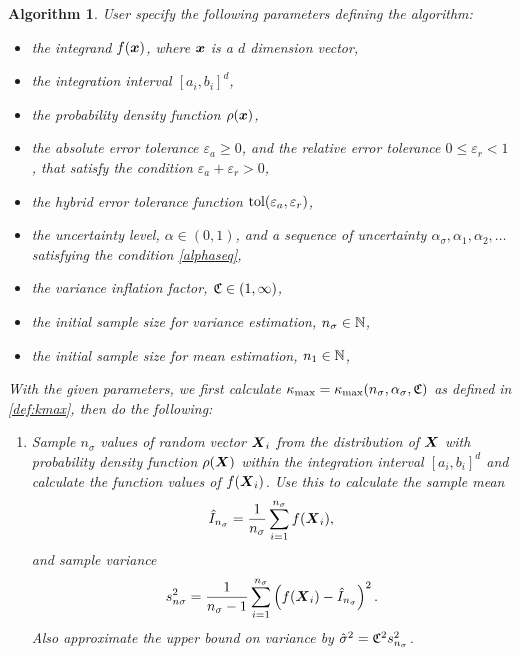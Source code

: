 \documentclass{iitthesis}
\newtheorem{algorithm}[theorem]{Algorithm}
\begin{document}
\begin{algorithm}\label{alg:cubMCg} 
User specify the following parameters defining the algorithm:
\begin{itemize}
\item the integrand $f(\boldsymbol{x})$, where $\boldsymbol{x}$ is a $d$ dimension vector, 
\item the integration interval $[a_i,b_i]^d$,
\item the probability density function $\rho(\boldsymbol{x})$,
\item the absolute error tolerance $\varepsilon_a \geq 0$, and the relative error tolerance $0 \leq \varepsilon_r <1$, that satisfy the condition $\varepsilon_a+\varepsilon_r >0$,
\item the hybrid error tolerance function $\operatorname{tol}(\varepsilon_a,\varepsilon_r)$,
\item the uncertainty level, $\alpha\in (0,1)$, and a sequence of uncertainty $ \alpha_\sigma, \alpha_1,  \alpha_2, \ldots$ satisfying the condition \eqref{alphaseq}, 
\item the variance inflation factor, $\mathfrak{C} \in (1,\infty)$, 
\item the initial sample size for variance estimation, $n_{\sigma} \in \mathbb{N}$,
\item the initial sample size for mean estimation, $n_1 \in \mathbb{N}$,
\end{itemize} 
With the given parameters, we first calculate $\kappa_{\max}=\kappa_{\max}(n_\sigma,\alpha_\sigma,\mathfrak{C})$ as defined in \eqref{def:kmax}, then do the following:
\begin{enumerate}
\item Sample $n_\sigma$ values of random vector $\boldsymbol{X}_i$ from the distribution of $\boldsymbol{X}$ with probability density function $\rho(\boldsymbol{X})$ within the integration interval $[a_i,b_i]^d$ and calculate the function values of $f(\boldsymbol{X}_i)$. Use this to calculate the sample mean $$\hat{I}_{n_\sigma} = \frac{1}{n_\sigma}\sum_{i=1}^{n_\sigma} f(\boldsymbol{X}_i),$$ and sample variance $$s_{n\sigma}^2 = \frac{1}{n_\sigma-1}\sum_{i=1}^{n_\sigma} \left(f(\boldsymbol{X}_i)-\hat{I}_{n_\sigma}\right)^2.$$ Also approximate the upper bound on variance by $\hat{\sigma}^2 = \mathfrak{C}^2 s^2_{n_\sigma}$. 


\end{enumerate}
\end{algorithm}
\end{document}
